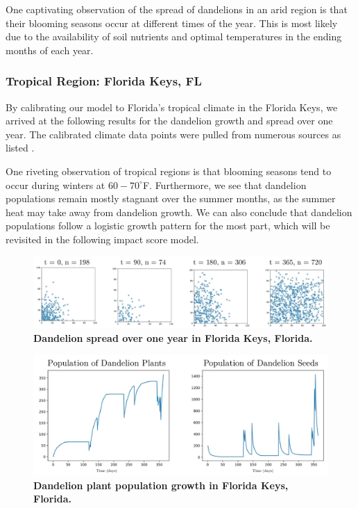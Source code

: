 One captivating observation of the spread of dandelions in an arid region is that their blooming seasons occur at different times of the year. This is most likely due to the availability of soil nutrients and optimal temperatures in the ending months of each year.

\subsubsection{Tropical Region: Florida Keys, FL}

By calibrating our model to Florida's tropical climate in the Florida Keys, we arrived at the following results for the dandelion growth and spread over one year. The calibrated climate data points were pulled from numerous sources as listed \cite{obreza_importance_2003, noauthor_average_nodate-1, pritchett_nitrogen_1959}.

One riveting observation of tropical regions is that blooming seasons tend to occur during winters at \(60-70^\circ\)F. Furthermore, we see that dandelion populations remain mostly stagnant over the summer months, as the summer heat may take away from dandelion growth. We can also conclude that dandelion populations follow a logistic growth pattern for the most part, which will be revisited in the following impact score model.

\begin{figure}[h!]
\centering
    \includegraphics[scale=0.6]{figures/floridadistributions.pdf}
    \captionsetup{width=0.9\textwidth}
    \caption{\textbf{Dandelion spread over one year in Florida Keys, Florida.} }
    \label{fig:floridaspread}
\end{figure}

\begin{figure}[h!]
\centering
    \includegraphics[scale=0.5]{figures/floridapopulation.pdf}
    \captionsetup{width=0.9\textwidth}
    \caption{\textbf{Dandelion plant population growth in Florida Keys, Florida.}}
    \label{fig:floridapopulation}
\end{figure}

